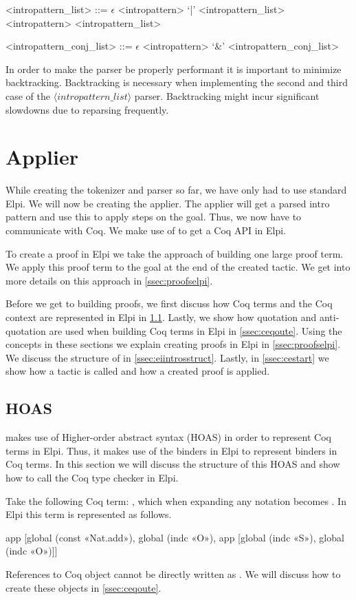 \documentclass[thesis.tex]{subfiles}
\begin{document}
{{\begin{grammar}
  <intropattern\_list> ::= $\epsilon$
  \alt <intropattern> `|' <intropattern\_list>
  \alt <intropattern> <intropattern\_list>

  <intropattern\_conj\_list> ::= $\epsilon$
  \alt <intropattern> `&' <intropattern\_conj\_list>
\end{grammar}
In order to make the parser be properly performant it is important to minimize backtracking. Backtracking is necessary when implementing the second and third case of the $\langle intropattern\_list\rangle$ parser. Backtracking might incur significant slowdowns due to reparsing frequently.

\section{Applier}\label{ssec:applier}
While creating the tokenizer and parser so far, we have only had to use standard Elpi. We will now be creating the applier. The applier will get a parsed intro pattern and use this to apply steps on the goal. Thus, we now have to communicate with Coq. We make use of \ce \cite{tassiElpiExtensionLanguage2018} to get a Coq API in Elpi.

To create a proof in Elpi we take the approach of building one large proof term. We apply this proof term to the goal at the end of the created tactic. We get into more details on this approach in \cref{ssec:proofselpi}.

Before we get to building proofs, we first discuss how Coq terms and the Coq context are represented in Elpi in \cref{ssec:cehoas}. Lastly, we show how quotation and anti-quotation are used when building Coq terms in Elpi in \cref{ssec:ceqoute}. Using the concepts in these sections we explain creating proofs in Elpi in \cref{ssec:proofselpi}. We discuss the structure of  in \cref{ssec:eiintrosstruct}. Lastly, in \cref{ssec:cestart} we show how a tactic is called and how a created proof is applied.


\subsection{\ce HOAS} \label{ssec:cehoas}
\ce makes use of Higher-order abstract syntax (HOAS) in order to represent Coq terms in Elpi. Thus, it makes use of the binders in Elpi to represent binders in Coq terms. In this section we will discuss the structure of this HOAS and show how to call the Coq type checker in Elpi.

Take the following Coq term: , which when expanding any notation becomes . In Elpi this term is represented as follows.
\begin{elpicode}
  app [global (const «Nat.add»), 
      global (indc «O»), 
      app [global (indc «S»), global (indc «O»)]]
\end{elpicode}
References to Coq object cannot be directly written as . We will discuss how to create these objects in \cref{ssec:ceqoute}.

}}
\end{document}
